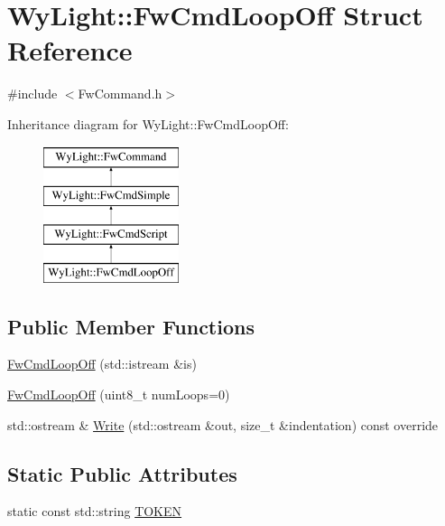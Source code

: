 \hypertarget{struct_wy_light_1_1_fw_cmd_loop_off}{\section{Wy\-Light\-:\-:Fw\-Cmd\-Loop\-Off Struct Reference}
\label{struct_wy_light_1_1_fw_cmd_loop_off}
}


{\ttfamily \#include $<$Fw\-Command.\-h$>$}

Inheritance diagram for Wy\-Light\-:\-:Fw\-Cmd\-Loop\-Off\-:\begin{figure}[H]
\begin{center}
\leavevmode
\includegraphics[height=4.000000cm]{struct_wy_light_1_1_fw_cmd_loop_off}
\end{center}
\end{figure}
\subsection*{Public Member Functions}
\begin{DoxyCompactItemize}
\item 
\hyperlink{struct_wy_light_1_1_fw_cmd_loop_off_a260dd9082278ff7b0921f775cb3b0f6d}{Fw\-Cmd\-Loop\-Off} (std\-::istream \&is)
\item 
\hyperlink{struct_wy_light_1_1_fw_cmd_loop_off_ad67156bc70cd34d22d3ade15b7bf1a20}{Fw\-Cmd\-Loop\-Off} (uint8\-\_\-t num\-Loops=0)
\item 
std\-::ostream \& \hyperlink{struct_wy_light_1_1_fw_cmd_loop_off_ac4afc42d823339073264a7e0ba1d7ad9}{Write} (std\-::ostream \&out, size\-\_\-t \&indentation) const override
\end{DoxyCompactItemize}
\subsection*{Static Public Attributes}
\begin{DoxyCompactItemize}
\item 
static const std\-::string \hyperlink{struct_wy_light_1_1_fw_cmd_loop_off_a6f9765373a55b16005a68a8735aa06b8}{T\-O\-K\-E\-N}
\end{DoxyCompactItemize}
